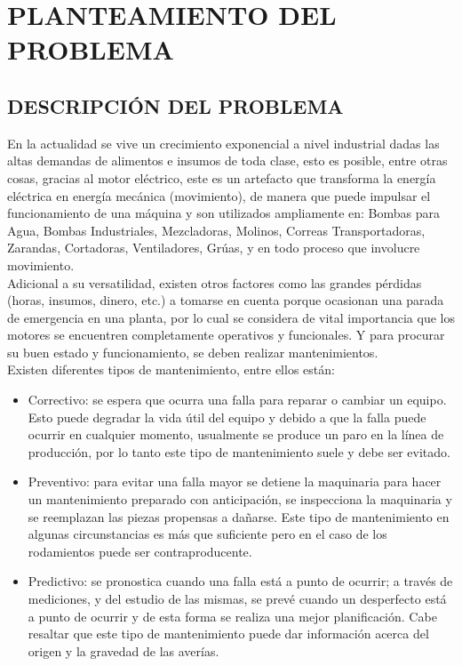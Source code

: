 \thispagestyle{empty}
\setcounter{page}{5}



	\section{PLANTEAMIENTO DEL PROBLEMA}



\subsection{DESCRIPCIÓN DEL PROBLEMA}

	En la actualidad se vive un crecimiento exponencial a nivel industrial dadas las altas demandas de alimentos e insumos de toda clase, esto es posible, entre otras cosas, gracias al motor eléctrico, este es un artefacto que transforma la energía eléctrica en energía mecánica (movimiento), de manera que puede impulsar el funcionamiento de una máquina y son utilizados ampliamente en: Bombas para Agua, Bombas Industriales, Mezcladoras, Molinos, Correas Transportadoras, Zarandas, Cortadoras, Ventiladores, Grúas, y en todo proceso que involucre movimiento.\\


	Adicional a su versatilidad, existen otros factores como las grandes pérdidas (horas, insumos, dinero, etc.) a tomarse en cuenta porque ocasionan una parada de emergencia en una planta, por lo cual se considera de vital importancia que los motores se encuentren completamente operativos y funcionales. Y para procurar su buen estado y funcionamiento, se deben realizar mantenimientos.\\



	Existen diferentes tipos de mantenimiento, entre ellos están:
	\begin{itemize}
		\item Correctivo: se espera que ocurra una falla para reparar o cambiar un equipo. Esto puede degradar la vida útil del equipo y debido a que la falla puede ocurrir en cualquier momento, usualmente se produce un paro en la línea de producción, por lo tanto este tipo de mantenimiento suele y debe ser evitado.

		\item Preventivo: para evitar una falla mayor se detiene la maquinaria para hacer un mantenimiento preparado con anticipación, se inspecciona la maquinaria y se reemplazan las piezas propensas a dañarse. Este tipo de mantenimiento en algunas circunstancias es más que suficiente pero en el caso de los rodamientos puede ser contraproducente.

		\item Predictivo: se pronostica cuando una falla está a punto de ocurrir; a través de mediciones, y del estudio de las mismas, se prevé cuando un desperfecto está a punto de ocurrir y de esta forma se realiza una mejor planificación. Cabe resaltar que este tipo de mantenimiento puede dar información acerca del origen y la gravedad de las averías.
	\end{itemize}


